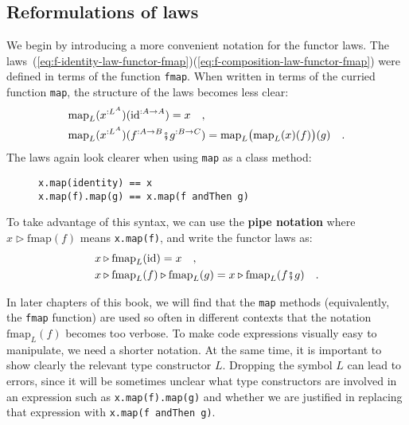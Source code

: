 \subsection{Reformulations of laws}

We begin by introducing a more convenient notation for the functor
laws. The laws~(\ref{eq:f-identity-law-functor-fmap})\textendash (\ref{eq:f-composition-law-functor-fmap})
were defined in terms of the function \lstinline!fmap!. When written
in terms of the curried function \lstinline!map!, the structure of
the laws becomes less clear:
\begin{align*}
 & \text{map}_{L}(x^{:L^{A}})(\text{id}^{:A\rightarrow A})=x\quad,\\
 & \text{map}_{L}(x^{:L^{A}})(f^{:A\rightarrow B}\bef g^{:B\rightarrow C})=\text{map}_{L}\big(\text{map}_{L}(x)(f)\big)(g)\quad.
\end{align*}
The laws again look clearer when using \lstinline!map! as a class
method:

\begin{wrapfigure}{l}{0.4\columnwidth}%
\vspace{-0.8\baselineskip}
\begin{lstlisting}
x.map(identity) == x
x.map(f).map(g) == x.map(f andThen g)
\end{lstlisting}

\vspace{-0.5\baselineskip}
\end{wrapfigure}%
To take advantage of this syntax, we can use the \textbf{pipe
notation} where $x\triangleright\text{fmap}(f)$ means \lstinline!x.map(f)!,
and write the functor laws as:
\begin{align*}
 & x\triangleright\text{fmap}_{L}(\text{id})=x\quad,\\
 & x\triangleright\text{fmap}_{L}(f)\triangleright\text{fmap}_{L}(g)=x\triangleright\text{fmap}_{L}(f\bef g)\quad.
\end{align*}

In later chapters of this book, we will find that the \lstinline!map!
methods (equivalently, the \lstinline!fmap! function) are used so
often in different contexts that the notation $\text{fmap}_{L}(f)$
becomes too verbose. To make code expressions visually easy to manipulate,
we need a shorter notation. At the same time, it is important to show
clearly the relevant type constructor $L$. Dropping the symbol $L$
can lead to errors, since it will be sometimes unclear what type constructors
are involved in an expression such as \lstinline!x.map(f).map(g)!
and whether we are justified in replacing that expression with \lstinline!x.map(f andThen g)!.

